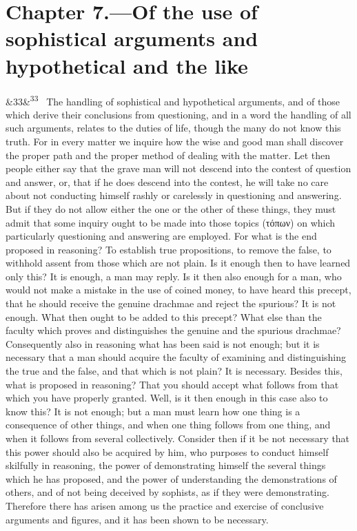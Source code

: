 \documentclass[12pt]{article}
\newcommand{\para}[1][]{\par\noindent\ifx&#1&\else\textsuperscript{\footnotesize #1}~\fi}
\begin{document}
\section*{Chapter 7.---Of the use of sophistical arguments and hypothetical and the like}

\para[33] The handling of sophistical and hypothetical arguments, and of those which derive their conclusions from questioning, and in a word the handling of all such arguments, relates to the duties of life, though the many do not know this truth. For in every matter we inquire how the wise and good man shall discover the proper path and the proper method of dealing with the matter. Let then people either say that the grave man will not descend into the contest of question and answer, or, that if he does descend into the contest, he will take no care about not conducting himself rashly or carelessly in questioning and answering. But if they do not allow either the one or the other of these things, they must admit that some inquiry ought to be made into those topics (τόπων) on which particularly questioning and answering are employed. For what is the end proposed in reasoning? To establish true propositions, to remove the false, to withhold assent from those which are not plain. Is it enough then to have learned only this? It is enough, a man may reply. Is it then also enough for a man, who would not make a mistake in the use of coined money, to have heard this precept, that he should receive the genuine drachmae and reject the spurious? It is not enough. What then ought to be added to this precept? What else than the faculty which proves and distinguishes the genuine and the spurious drachmae? Consequently also in reasoning what has been said is not enough; but it is necessary that a man should acquire the faculty of examining and distinguishing the true and the false, and that which is not plain? It is necessary. Besides this, what is proposed in reasoning? That you should accept what follows from that which you have properly granted. Well, is it then enough in this case also to know this? It is not enough; but a man must learn how one thing is a consequence of other things, and when one thing follows from one thing, and when it follows from several collectively. Consider then if it be not necessary that this power should also be acquired by him, who purposes to conduct himself skilfully in reasoning, the power of demonstrating himself the several things which he has proposed, and the power of understanding the demonstrations of others, and of not being deceived by sophists, as if they were demonstrating. Therefore there has arisen among us the practice and exercise of conclusive arguments and figures, and it has been shown to be necessary.
\end{document}
